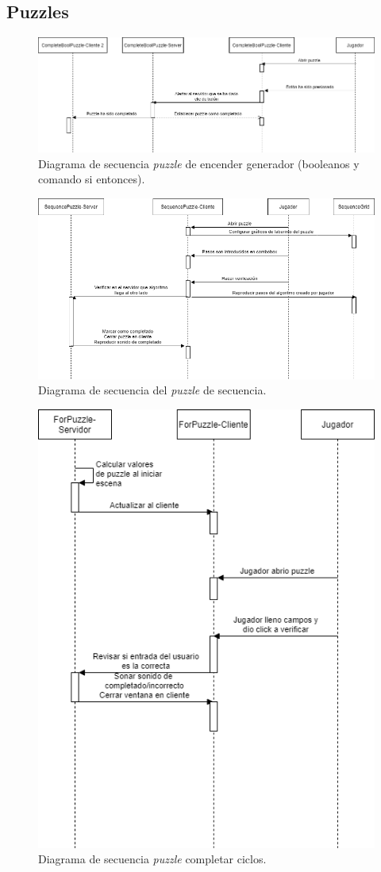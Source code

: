 \subsection{Puzzles}
        \begin{figure}[H]
        \centering
        \includegraphics[width=0.8\linewidth]{images/DiagramaSecuenciaPuzzleBool.png}
        \caption{Diagrama de secuencia \textit{puzzle} de encender generador (booleanos y comando si entonces).}
        \label{fig:diagrama_sec_booleano}
    \end{figure}
        \begin{figure}[H]
        \centering
        \includegraphics[width=0.8\linewidth]{images/DiagramaSecuenciaPuzzleSecuencia.drawio.png}
        \caption{Diagrama de secuencia del \textit{puzzle} de secuencia.}
        \label{fig:diagrama_sec_sec}
    \end{figure}
        \begin{figure}[H]
        \centering
        \includegraphics[width=0.4\linewidth]{images/diagrama_sec_for_while.png}
        \caption{Diagrama de secuencia \textit{puzzle} completar ciclos.}
        \label{fig:diagrama_sec_for_while}
    \end{figure}

